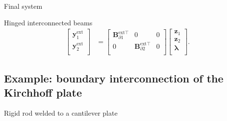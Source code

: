 \documentclass[aspectratio=169]{ISAE-Beamer}
\begin{document}
\begin{frame}{Final system}
\begin{block}{Hinged interconnected beams}
\begin{equation*}
\begin{aligned}
\begin{bmatrix}
\mathbf{y}_1^{\text{ext}} \\ \mathbf{y}_2^{\text{ext}} \\
\end{bmatrix}  &= \begin{bmatrix}
\mathbf{B}_{\partial 1}^{\text{ext} \top} & 0 & 0 \\
0 & \mathbf{B}_{\partial 2}^{\text{ext} \top} & 0 \\
\end{bmatrix} \begin{bmatrix}
\mathbf{z}_1  \\ 
\mathbf{z}_2  \\ 
\bm{\lambda} \\
\end{bmatrix}.
\end{aligned}
\end{equation*}
\end{block}
\end{frame}

\subsection{Example: boundary interconnection of the Kirchhoff plate}

\begin{frame}{Rigid rod welded to a cantilever plate }
\begin{tcolorbox}
	\centering
\end{tcolorbox}

\end{frame}
\end{document}
